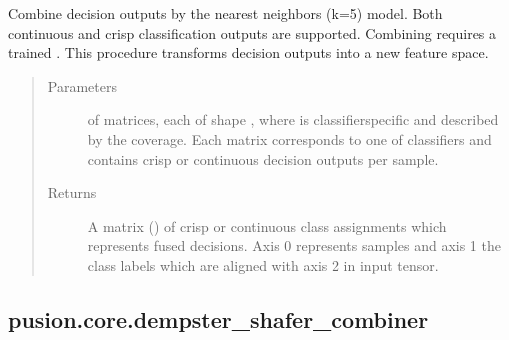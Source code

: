 \documentclass[letterpaper,10pt,english]{sphinxmanual}
\begin{document}
\begin{fulllineitems}
\begin{fulllineitems}
\label{\detokenize{pusion.core.k_nearest_neighbors_combiner:pusion.core.k_nearest_neighbors_combiner.CRKNNCombiner.combine}}
\sphinxAtStartPar
Combine decision outputs by the  nearest neighbors (k=5) model.
Both continuous and crisp classification outputs are supported. Combining requires a trained
.
This procedure transforms decision outputs into a new feature space.
\begin{quote}\begin{description}
\item[{Parameters}] \leavevmode
\sphinxAtStartPar
{} \textendash{}  of  matrices, each of shape ,
where  is classifier\sphinxhyphen{}specific and described by the coverage. Each matrix corresponds to
one of  classifiers and contains crisp or continuous decision outputs per sample.

\item[{Returns}] \leavevmode
\sphinxAtStartPar
A matrix () of crisp or continuous class assignments which represents fused decisions.
Axis 0 represents samples and axis 1 the class labels which are aligned with axis 2 in
 input tensor.

\end{description}\end{quote}

\end{fulllineitems}


\end{fulllineitems}



\subsection{pusion.core.dempster\_shafer\_combiner}
\label{\detokenize{pusion.core.dempster_shafer_combiner:module-pusion.core.dempster_shafer_combiner}}\label{\detokenize{pusion.core.dempster_shafer_combiner:pusion-core-dempster-shafer-combiner}}\label{\detokenize{pusion.core.dempster_shafer_combiner:ds-cref}}\label{\detokenize{pusion.core.dempster_shafer_combiner::doc}}
\end{document}
